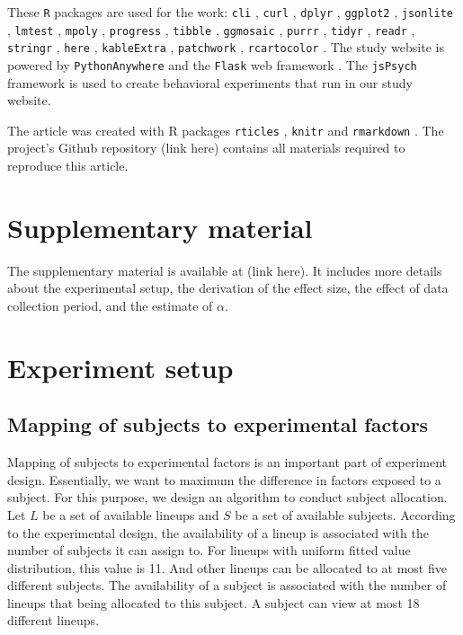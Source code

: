 \documentclass[]{interact}
\theoremstyle{plain}%
\theoremstyle{definition}
\theoremstyle{remark}
\begin{document}
These \texttt{R} packages are used for the work: \texttt{cli}
\citep{cli}, \texttt{curl} \citep{curl}, \texttt{dplyr} \citep{dplyr},
\texttt{ggplot2} \citep{ggplot2}, \texttt{jsonlite} \citep{jsonlite},
\texttt{lmtest} \citep{lmtest}, \texttt{mpoly} \citep{mpoly},
\texttt{progress} \citep{progress}, \texttt{tibble} \citep{tibble},
\texttt{ggmosaic} \citep{ggmosaic}, \texttt{purrr} \citep{purrr},
\texttt{tidyr} \citep{tidyr}, \texttt{readr} \citep{readr},
\texttt{stringr} \citep{stringr}, \texttt{here} \citep{here},
\texttt{kableExtra} \citep{kableextra}, \texttt{patchwork}
\citep{patchwork}, \texttt{rcartocolor} \citep{rcartocolor}. The study
website is powered by \texttt{PythonAnywhere} \citep{pythonanywhere} and
the \texttt{Flask} web framework \citep{flask}. The \texttt{jsPsych}
framework \citep{jspsych} is used to create behavioral experiments that
run in our study website.

The article was created with R packages \texttt{rticles}
\citep{rticles}, \texttt{knitr} \citep{knitr} and \texttt{rmarkdown}
\citep{rmarkdown}. The project's Github repository (link here) contains
all materials required to reproduce this article.

\hypertarget{supplementary-material}{%
\section*{Supplementary material}\label{supplementary-material}}

The supplementary material is available at (link here). It includes more
details about the experimental setup, the derivation of the effect size,
the effect of data collection period, and the estimate of \(\alpha\).

\hypertarget{experiment-setup}{%
\section{Experiment setup}\label{experiment-setup}}

\hypertarget{mapping-of-subjects-to-experimental-factors}{%
\subsection{Mapping of subjects to experimental
factors}\label{mapping-of-subjects-to-experimental-factors}}

Mapping of subjects to experimental factors is an important part of
experiment design. Essentially, we want to maximum the difference in
factors exposed to a subject. For this purpose, we design an algorithm
to conduct subject allocation. Let \(L\) be a set of available lineups
and \(S\) be a set of available subjects. According to the experimental
design, the availability of a lineup is associated with the number of
subjects it can assign to. For lineups with uniform fitted value
distribution, this value is 11. And other lineups can be allocated to at
most five different subjects. The availability of a subject is
associated with the number of lineups that being allocated to this
subject. A subject can view at most 18 different lineups.
\end{document}

